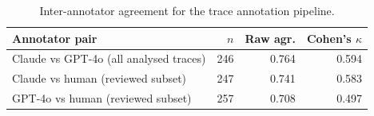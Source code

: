 \begin{table}[H]
\centering
\small
\caption{Inter-annotator agreement for the trace annotation pipeline.}
\label{tab:kappa}
\begin{tabular}{@{}lrrr@{}}
\toprule
\textbf{Annotator pair} & \textbf{$n$} & \textbf{Raw agr.} & \textbf{Cohen's $\kappa$} \\
\midrule
Claude vs GPT-4o (all analysed traces) & 246 & 0.764 & 0.594 \\
Claude vs human (reviewed subset) & 247 & 0.741 & 0.583 \\
GPT-4o vs human (reviewed subset) & 257 & 0.708 & 0.497 \\
\bottomrule
\end{tabular}
\end{table}